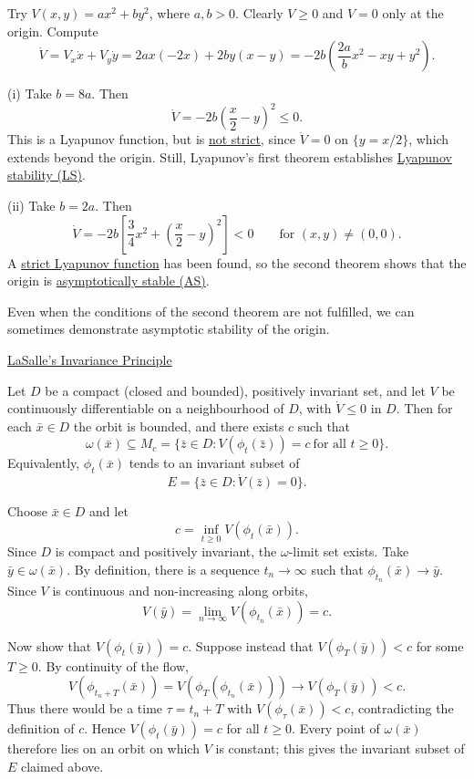 \documentclass[11pt,a4paper]{article}
\begin{document}
\medskip
\noindent Try $V(x,y)=ax^2+by^2$, where $a,b>0$. Clearly $V\geq0$ and $V=0$
only at the origin. Compute
\[
\dot V=V_x\dot x+V_y\dot y
=2ax(-2x)+2by(x-y)
=-2b\left(\frac{2a}{b}x^2-xy+y^2\right).
\]

\newpage
\noindent
(i) Take $b=8a$. Then
\[
\dot V=-2b\left(\frac{x}{2}-y\right)^2\leq0.
\]
This is a Lyapunov function, but is \underline{not strict}, since $\dot V=0$
on $\{y=x/2\}$, which extends beyond the origin. Still, Lyapunov's first
theorem establishes \underline{Lyapunov stability (LS)}.

\medskip
\noindent
(ii) Take $b=2a$. Then
\[
\dot V=-2b\left[\frac34x^2+\left(\frac{x}{2}-y\right)^2\right]<0
\qquad\text{for }(x,y)\neq(0,0).
\]
A \underline{strict Lyapunov function} has been found, so the second theorem
shows that the origin is \underline{asymptotically stable (AS)}.

\medskip
\noindent Even when the conditions of the second theorem are not fulfilled,
we can sometimes demonstrate asymptotic stability of the origin.

\medskip
\noindent{}\quad\underline{LaSalle's Invariance Principle}

\medskip
\noindent
Let $D$ be a compact (closed and bounded), positively invariant set, and let
$V$ be continuously differentiable on a neighbourhood of $D$, with $\dot V\leq0$
in $D$. Then for each $\bar x\in D$ the orbit is bounded, and there exists $c$
such that
\[
\omega(\bar x)\subseteq M_c
=\{\bar z\in D:V(\phi_t(\bar z))=c\ \text{for all }t\geq0\}.
\]
Equivalently, $\phi_t(\bar x)$ tends to an invariant subset of
\[
E=\{\bar z\in D:\dot V(\bar z)=0\}.
\]

\medskip
\noindent{}\quad Choose $\bar x\in D$ and let
\[
c=\inf_{t\geq0}V(\phi_t(\bar x)).
\]
Since $D$ is compact and positively invariant, the $\omega$-limit set exists.
Take $\bar y\in\omega(\bar x)$. By definition, there is a sequence $t_n\to\infty$
such that $\phi_{t_n}(\bar x)\to\bar y$. Since $V$ is continuous and
non-increasing along orbits,
\[
V(\bar y)=\lim_{n\to\infty}V(\phi_{t_n}(\bar x))=c.
\]

\newpage
\noindent
Now show that $V(\phi_t(\bar y))=c$. Suppose instead that
$V(\phi_T(\bar y))<c$ for some $T\geq0$. By continuity of the flow,
\[
V(\phi_{t_n+T}(\bar x))
=V(\phi_T(\phi_{t_n}(\bar x)))
\longrightarrow V(\phi_T(\bar y))<c.
\]
Thus there would be a time $\tau=t_n+T$ with
$V(\phi_\tau(\bar x))<c$, contradicting the definition of $c$.
Hence $V(\phi_t(\bar y))=c$ for all $t\geq0$.
Every point of $\omega(\bar x)$ therefore lies on an orbit on which $V$ is
constant; this gives the invariant subset of $E$ claimed above.
\end{document}
